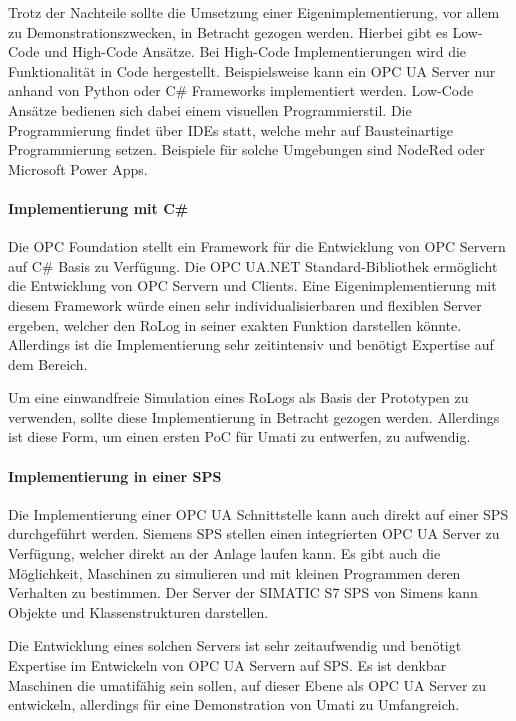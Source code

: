\documentclass[a4paper, 12pt, oneside, toc=listofnumbered, bibliography=totoc]{scrbook}
\begin{document}
			Trotz der Nachteile sollte die Umsetzung einer Eigenimplementierung, vor allem zu Demonstrationszwecken, in Betracht gezogen werden. Hierbei gibt es Low-Code und High-Code Ansätze. Bei High-Code Implementierungen wird die Funktionalität in Code hergestellt. Beispielsweise kann ein OPC UA Server nur anhand von Python oder C\# Frameworks implementiert werden. Low-Code Ansätze bedienen sich dabei einem visuellen Programmierstil. Die Programmierung findet über IDEs statt, welche mehr auf Bausteinartige Programmierung setzen. Beispiele für solche Umgebungen sind NodeRed oder Microsoft Power Apps. 
			
			\paragraph{Implementierung mit C\#}
			Die OPC Foundation stellt ein Framework für die Entwicklung von OPC Servern auf C\# Basis zu Verfügung. Die OPC UA.NET Standard-Bibliothek ermöglicht die Entwicklung von OPC Servern und Clients. Eine Eigenimplementierung mit diesem Framework würde einen sehr individualisierbaren und flexiblen Server ergeben, welcher den RoLog in seiner exakten Funktion darstellen könnte. Allerdings ist die Implementierung sehr zeitintensiv und benötigt Expertise auf dem Bereich. \cite{noauthor_opc_nodate-1}
			
			Um eine einwandfreie Simulation eines RoLogs als Basis der Prototypen zu verwenden, sollte diese Implementierung in Betracht gezogen werden. Allerdings ist diese Form, um einen ersten \ac{PoC} für Umati zu entwerfen, zu aufwendig.
			
			\paragraph{Implementierung in einer SPS}
			Die Implementierung einer OPC UA Schnittstelle kann auch direkt auf einer SPS durchgeführt werden. Siemens SPS stellen einen integrierten OPC UA Server zu Verfügung, welcher direkt an der Anlage laufen kann. Es gibt auch die Möglichkeit, Maschinen zu simulieren und mit kleinen Programmen deren Verhalten zu bestimmen. Der Server der SIMATIC S7 SPS von Simens kann Objekte und Klassenstrukturen darstellen. \cite{noauthor_tia_2019}
			
			Die Entwicklung eines solchen Servers ist sehr zeitaufwendig und benötigt Expertise im Entwickeln von OPC UA Servern auf SPS. Es ist denkbar Maschinen die umatifähig sein sollen, auf dieser Ebene als OPC UA Server zu entwickeln, allerdings für eine Demonstration von Umati zu Umfangreich.
			
\end{document}
